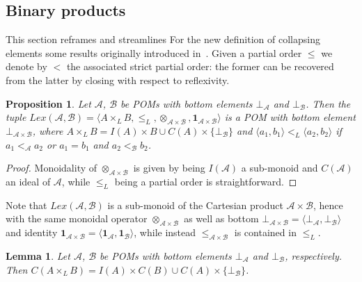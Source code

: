 \documentclass[a4paper]{elsarticle}
\newtheorem{lemma}{Lemma}
\newtheorem{proposition}{Proposition}
\newcommand{\monop}{\otimes}
\newcommand{\1}{\mathbf{1}}
\begin{document}
\subsection{Binary products}\label{sec:lexico}

This section reframes and streamlines For the new definition of collapsing elements some results originally
introduced in~\cite{GadducciHMW13}. Given a partial order $\leq$ we denote by $<$ the associated strict 
partial order: the former can be recovered from the latter by closing with respect to reflexivity.

\begin{proposition}\label{def:lexBI}
	Let $\mathcal{A}$, $\mathcal{B}$ be POMs with bottom elements $\bot_\mathcal{A}$ and $\bot_\mathcal{B}$.
	Then the tuple $Lex(\mathcal{A}, \mathcal{B}) = 
	\langle A \times_L B, \leq_L, \monop_{\mathcal{A} \times \mathcal{B}}, \1_{\mathcal{A} \times \mathcal{B}} \rangle$
	is a POM with bottom element $\bot_{\mathcal{A} \times \mathcal{B}}$,
	where $A \times_L B = I(A) \times B \cup C(A) \times \{\bot_\mathcal{B}\}$ and
		$\langle a_1, b_1\rangle <_L \langle a_2, b_2\rangle$ if $a_1 <_\mathcal{A} a_2$ or $a_1 = b_1$ 
		and  $a_2 <_\mathcal{B} b_2$.
\end{proposition}

\begin{proof}
	Monoidality of $\monop_{\mathcal{A} \times \mathcal{B}}$ is given by being $I(\mathcal{A})$ a sub-monoid
	and $C(\mathcal{A})$ an ideal of $\mathcal{A}$, while $\leq_L$ being a partial order is straightforward.
\end{proof}

Note that $Lex(\mathcal{A},\mathcal{B})$ is a sub-monoid of the Cartesian product $\mathcal{A} \times \mathcal{B}$,
hence with the same monoidal operator $\monop_{\mathcal{A} \times \mathcal{B}}$ as well as 
bottom $\bot_{\mathcal{A} \times \mathcal{B}} = \langle \bot_\mathcal{A}, \bot_\mathcal{B} \rangle$ and
identity $\1_{\mathcal{A} \times \mathcal{B}} = \langle \1_\mathcal{A}, \1_\mathcal{B} \rangle$,
while instead $\leq_{\mathcal{A} \times \mathcal{B}}$ is contained in $\leq_L$.
%

\begin{lemma}
Let $\mathcal{A}$, $\mathcal{B}$ be POMs with bottom elements $\bot_\mathcal{A}$ and $\bot_\mathcal{B}$, 
respectively.
Then $C(A \times_L B) = I(A) \times C(B) \cup C(A) \times \{\bot_\mathcal{B}\}$.
\end{lemma}
\end{document}
